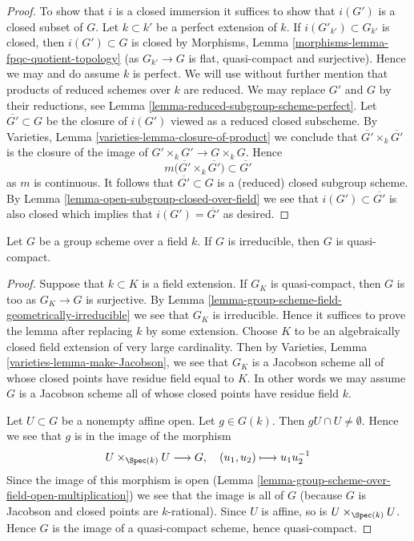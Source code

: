 \begin{proof}
To show that $i$ is a closed immersion it suffices to show that
$i(G')$ is a closed subset of $G$. Let $k \subset k'$ be a perfect
extension of $k$. If $i(G'_{k'}) \subset G_{k'}$ is closed, then
$i(G') \subset G$ is closed by
Morphisms, Lemma \ref{morphisms-lemma-fpqc-quotient-topology}
(as $G_{k'} \to G$ is flat, quasi-compact and surjective).
Hence we may and do assume $k$ is perfect. We will use without further
mention that products of reduced schemes over $k$ are reduced.
We may replace $G'$ and $G$ by their reductions, see
Lemma \ref{lemma-reduced-subgroup-scheme-perfect}.
Let $\overline{G'} \subset G$ be the closure of $i(G')$ viewed
as a reduced closed subscheme. By
Varieties, Lemma \ref{varieties-lemma-closure-of-product}
we conclude that $\overline{G'} \times_k \overline{G'}$
is the closure of the image of $G' \times_k G' \to G \times_k G$. Hence
$$
m\Big(\overline{G'} \times_k \overline{G'}\Big)
\subset \overline{G'}
$$
as $m$ is continuous. It follows that $\overline{G'} \subset G$
is a (reduced) closed subgroup scheme. By
Lemma \ref{lemma-open-subgroup-closed-over-field}
we see that $i(G') \subset \overline{G'}$ is also closed
which implies that $i(G') = \overline{G'}$ as desired.
\end{proof}

\begin{lemma}
\label{lemma-irreducible-group-scheme-over-field-qc}
Let $G$ be a group scheme over a field $k$. If $G$ is irreducible,
then $G$ is quasi-compact.
\end{lemma}

\begin{proof}
Suppose that $k \subset K$ is a field extension. If $G_K$
is quasi-compact, then $G$ is too as $G_K \to G$ is surjective.
By Lemma \ref{lemma-group-scheme-field-geometrically-irreducible}
we see that $G_K$ is irreducible. Hence it suffices to prove the lemma
after replacing $k$ by some extension. Choose $K$ to be an algebraically
closed field extension of very large cardinality. Then by
Varieties, Lemma \ref{varieties-lemma-make-Jacobson},
we see that $G_K$ is a Jacobson scheme all of whose closed points have residue
field equal to $K$. In other words we may assume $G$ is a Jacobson
scheme all of whose closed points have residue field $k$.

\medskip\noindent
Let $U \subset G$ be a nonempty affine open. Let $g \in G(k)$. Then
$gU \cap U \not = \emptyset$. Hence we see that $g$ is in the image
of the morphism
$$
U \times_{\Spec(k)} U \longrightarrow G, \quad
(u_1, u_2) \longmapsto u_1u_2^{-1}
$$
Since the image of this morphism is open
(Lemma \ref{lemma-group-scheme-over-field-open-multiplication})
we see that the image is all of $G$ (because $G$ is Jacobson
and closed points are $k$-rational).
Since $U$ is affine, so is $U \times_{\Spec(k)} U$. Hence $G$ is the
image of a quasi-compact scheme, hence quasi-compact.
\end{proof}

